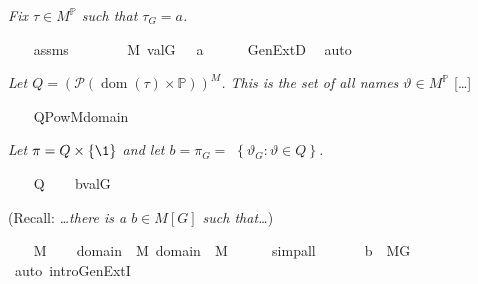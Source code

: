 \textit{Fix $\tau \in  M^{\mathbb{P}}$ such that $\tau_{G}=a$.}
\begin{isabelle}
\ \ \isamarkupfalse%
\ assms\isanewline
\ \ \isamarkupfalse%
\ {\isasymtau}\ \ {\isachardoublequoteopen}{\isasymtau}\ {\isasymin}\ M{\isachardoublequoteclose}\ {\isachardoublequoteopen}val{\isacharparenleft}{\kern0pt}G{\isacharcomma}{\kern0pt}\ {\isasymtau}{\isacharparenright}{\kern0pt}\ {\isacharequal}{\kern0pt}\ a{\isachardoublequoteclose}\isanewline
\ \ \ \ \isamarkupfalse%
\ GenExtD\ \isamarkupfalse%
\ auto
\end{isabelle}
\textit{Let
  $Q=(\mathcal{P}(\operatorname{dom}(\tau) \times
  \mathbb{P}))^{M}$. This is the set of all names $\vartheta \in
  M^{\mathbb{P}}$} [\dots]%
\begin{isabelle}
\ \ \isamarkupfalse%
\ {\isacharquery}{\kern0pt}Q{\isacharequal}{\kern0pt}{\isachardoublequoteopen}Pow\isactrlbsup M\isactrlesup {\isacharparenleft}{\kern0pt}domain{\isacharparenleft}{\kern0pt}{\isasymtau}{\isacharparenright}{\kern0pt}{\isasymtimes}{\isasymbbbP}{\isacharparenright}{\kern0pt}{\isachardoublequoteclose}
\end{isabelle}
\textit{ Let $\pi=Q \times\{\1\}$ and let
  $b=\pi_{G}=$ $\left\{\vartheta_{G}: \vartheta \in Q\right\}$.}
\begin{isabelle}
\ \ \isamarkupfalse%
\ {\isacharquery}{\kern0pt}{\isasympi}{\isacharequal}{\kern0pt}{\isachardoublequoteopen}{\isacharquery}{\kern0pt}Q{\isasymtimes}{\isacharbraceleft}{\kern0pt}{\isasymone}{\isacharbraceright}{\kern0pt}{\isachardoublequoteclose}\isanewline
\ \ \isamarkupfalse%
\ {\isacharquery}{\kern0pt}b{\isacharequal}{\kern0pt}{\isachardoublequoteopen}val{\isacharparenleft}{\kern0pt}G{\isacharcomma}{\kern0pt}{\isacharquery}{\kern0pt}{\isasympi}{\isacharparenright}{\kern0pt}{\isachardoublequoteclose}
\end{isabelle}
(Recall: \textit{\dots there is a $b\in M[G]$ such that\dots})
\begin{isabelle}
\ \ \isamarkupfalse%
\ {\isacartoucheopen}{\isasymtau}{\isasymin}M{\isacartoucheclose}\isanewline
\ \ \isamarkupfalse%
\ {\isachardoublequoteopen}domain{\isacharparenleft}{\kern0pt}{\isasymtau}{\isacharparenright}{\kern0pt}{\isasymtimes}{\isasymbbbP}\ {\isasymin}\ M{\isachardoublequoteclose}\ {\isachardoublequoteopen}domain{\isacharparenleft}{\kern0pt}{\isasymtau}{\isacharparenright}{\kern0pt}\ {\isasymin}\ M{\isachardoublequoteclose}\isanewline
\ \ \ \ \isamarkupfalse%
\ simp{\isacharunderscore}{\kern0pt}all\isanewline
\ \ \isamarkupfalse%
\isanewline
\ \ \isamarkupfalse%
\ {\isachardoublequoteopen}{\isacharquery}{\kern0pt}b\ {\isasymin}\ M{\isacharbrackleft}{\kern0pt}G{\isacharbrackright}{\kern0pt}{\isachardoublequoteclose}\isanewline
\ \ \ \ \isamarkupfalse%
\ {\isacharparenleft}{\kern0pt}auto\ intro{\isacharbang}{\kern0pt}{\isacharcolon}{\kern0pt}GenExtI{\isacharparenright}{\kern0pt}
\end{isabelle}
